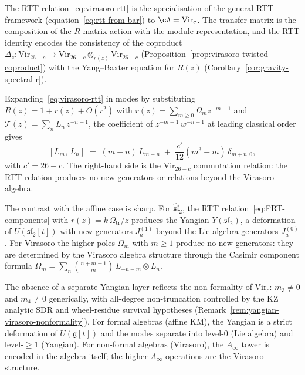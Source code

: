 \begin{remark}
The RTT relation~\eqref{eq:virasoro-rtt} is the specialisation
of the general RTT framework
(equation~\eqref{eq:rtt-from-bar}) to $\cA = \mathrm{Vir}_c$.
The transfer matrix is the composition of the $R$-matrix
action with the module representation, and the RTT identity
encodes the consistency of the coproduct
$\Delta_z \colon \mathrm{Vir}_{26-c} \to
\mathrm{Vir}_{26-c} \otimes_{r(z)} \mathrm{Vir}_{26-c}$
(Proposition~\ref{prop:virasoro-twisted-coproduct})
with the Yang--Baxter equation for $R(z)$
(Corollary~\ref{cor:gravity-spectral-r}).
\end{remark}

\begin{computation}
\label{comp:virasoro-rtt-modes}
Expanding~\eqref{eq:virasoro-rtt} in modes by substituting
$R(z) = 1 + r(z) + O(r^2)$
with $r(z) = \sum_{m \ge 0} \Omega_m z^{-m-1}$ and
$\mathcal{T}(z) = \sum_n L_n\,z^{-n-1}$,
the coefficient of $z^{-m-1}\,w^{-n-1}$ at leading
classical order gives
\begin{equation}\label{eq:virasoro-rtt-mode-relation}
[L_m,\, L_n]
\;=\;
(m{-}n)\,L_{m+n}
\;+\;
\frac{c'}{12}(m^3{-}m)\,\delta_{m+n,0},
\end{equation}
with $c' = 26 - c$. The right-hand side is the
$\mathrm{Vir}_{26-c}$ commutation relation: the RTT relation
produces no new generators or relations beyond the Virasoro algebra.

The contrast with the affine case is sharp. For
$\widehat{\mathfrak{sl}}_2$, the RTT relation~\eqref{eq:FRT-components}
with $r(z) = k\,\Omega_{\mathrm{tr}}/z$ produces the Yangian
$Y(\mathfrak{sl}_2)$, a deformation of $U(\mathfrak{sl}_2{[t]})$ with
new generators $J^{(1)}_a$ beyond the Lie algebra generators
$J^{(0)}_a$. For Virasoro the higher poles $\Omega_m$ with $m \ge 1$
produce no new generators: they are determined by the Virasoro
algebra structure through the Casimir component formula
$\Omega_m = \sum_n \binom{n+m-1}{m}\,L_{-n-m} \otimes L_n$.

The absence of a separate Yangian layer reflects the non-formality
of $\mathrm{Vir}_c$: $m_3\ne0$ and $m_4\ne0$ generically, with
all-degree non-truncation controlled by the KZ analytic SDR and
wheel-residue survival hypotheses
(Remark~\ref{rem:yangian-virasoro-nonformality}). For formal
algebras (affine KM), the Yangian is a strict deformation of
$U(\mathfrak{g}{[t]})$ and the modes separate into level-$0$ (Lie
algebra) and level-$\ge 1$ (Yangian). For non-formal algebras
(Virasoro), the $A_\infty$ tower is encoded in the algebra itself;
the higher $A_\infty$ operations are the Virasoro structure.
\end{computation}

